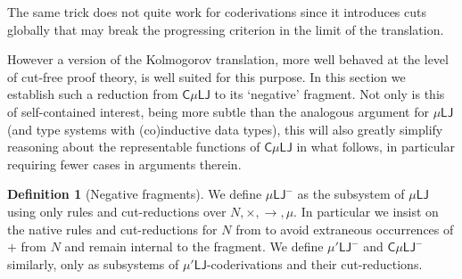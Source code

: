 \documentclass[10pt,a4paper]{amsart}
\theoremstyle{plain}
\theoremstyle{definition}
\newtheorem{defn}[defn]{Definition}
\newtheorem{remark}[remark]{Remark}
\newcommand{\red}[1]{{\color{red}#1}}
\newcommand{\anupam}[1]{\todo[color=green]{A: #1}}
\renewcommand{\todo}[1]{}
\renewcommand{\anupam}[1]{}
\newcommand{\todonew}[1]{{\red{TodoNew: #1}}}
\renewcommand{\todonew}[1]{}
\theoremstyle{plain}
\theoremstyle{definition} %
\newcommand{\nat}{\mathit{N}}
\newcommand{\N}{\nat} %
\newcommand{\arrow}{\to}
\newcommand{\LJ}{\mathsf{LJ}}
\newcommand{\muLJ}{\mu\LJ}
\newcommand{\muLJnorec}{\mu'\LJ}
\newcommand{\muLJneg}{\muLJ^-}
\newcommand{\muLJnegnorec}{\muLJnorec^-}
\newcommand{\circular}{\mathsf C}
\newcommand{\cmuLJ}{\circular\muLJ}
\newcommand{\cmuLJneg}{\cmuLJ^-}
\begin{document}
The same trick does not quite work for coderivations since it introduces cuts globally that may break the progressing criterion in the limit of the translation.
\todonew{could elaborate here}
However a version of the Kolmogorov translation, more well behaved at the level of cut-free proof theory, is well suited for this purpose.
% 
In this section we establish such a reduction from $\cmuLJ$ to its `negative' fragment.
Not only is this of self-contained interest, being more subtle than the analogous argument for $\muLJ$ (and type systems with (co)inductive data types), this will also greatly simplify reasoning about the representable functions of $\cmuLJ$ in what follows, in particular requiring fewer cases in arguments therein.



\begin{defn}[Negative fragments] \label{defn:negative-fragments}
We define $\muLJneg$ as the subsystem of $\muLJ$ using only rules and cut-reductions over $\N, \times, \arrow, \mu$.
In particular we insist on the native rules and cut-reductions for $\N$ from  to avoid extraneous occurrences of $+$ from $\N$ and remain internal to the fragment.
We define $\muLJnegnorec$ and $\cmuLJneg$ similarly, only as subsystems of $\muLJnorec$-coderivations and their cut-reductions.
\end{defn}


\end{document}
